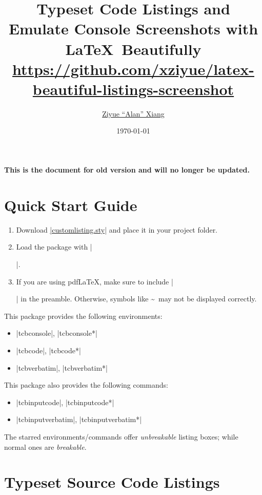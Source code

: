 \documentclass[letterpaper, 11pt, DIV=11]{scrartcl}
\author{\href{https://www.alanshawn.com}{Ziyue ``Alan'' Xiang}}
\title{Typeset Code Listings and Emulate Console Screenshots with \LaTeX\  Beautifully\\ {\small \url{https://github.com/xziyue/latex-beautiful-listings-screenshot}}}
\date{\today}
\begin{document}

\maketitle

\tableofcontents

\clearpage



\textbf{This is the document for old version and will no longer be updated.}

\section{Quick Start Guide}

\begin{enumerate}
\item Download \href{https://github.com/xziyue/latex-beautiful-listings-screenshot/blob/master/customlisting.sty}{\rawinline|customlisting.sty|} and place it in your project folder.
\item Load the package with \texinline|\usepackage{customlisting}|.
\item If you are using pdf\LaTeX, make sure to include \texinline|\usepackage[T1]{fontenc}| in the preamble. Otherwise, symbols like \textasciitilde\ may not be displayed correctly.
\end{enumerate}

This package provides the following environments:
\begin{itemize}
\item \rawinline|tcbconsole|, \rawinline|tcbconsole*|
\item \rawinline|tcbcode|, \rawinline|tcbcode*|
\item \rawinline|tcbverbatim|, \rawinline|tcbverbatim*|
\end{itemize}

This package also provides the following commands:
\begin{itemize}
\item \rawinline|tcbinputcode|, \rawinline|tcbinputcode*|
\item \rawinline|tcbinputverbatim|, \rawinline|tcbinputverbatim*|
\end{itemize}

The starred environments/commands offer \emph{unbreakable} listing boxes; while normal ones are \emph{breakable}.



\section{Typeset Source Code Listings}
\end{document}
